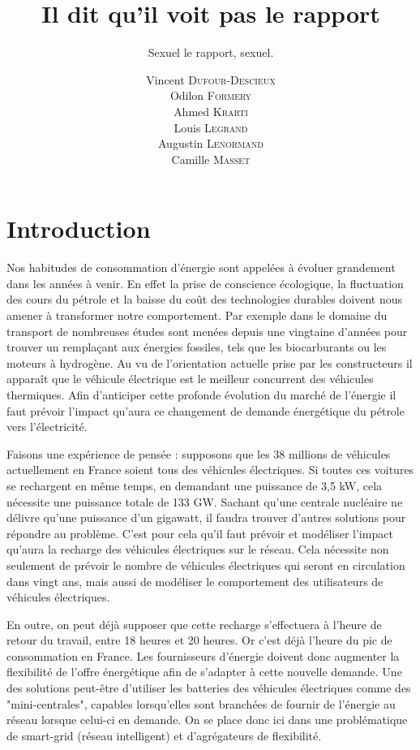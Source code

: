 \documentclass[10pt]{article}
\title{Il dit qu'il voit pas le rapport}
\subtitle{Sexuel le rapport, sexuel.}
\author{ Vincent \textsc{Dufour-Descieux} \\ Odilon \textsc{Formery} \\ Ahmed \textsc{Krarti} \\ Louis \textsc{Legrand} \\ Augustin \textsc{Lenormand} \\   Camille \textsc{Masset} }
\begin{document}
\maketitle
\section*{Introduction}

Nos habitudes de consommation d'énergie sont appelées à évoluer grandement dans les années à venir.
En effet la prise de conscience écologique, la fluctuation des cours du pétrole et la baisse du coût des technologies durables doivent nous amener à transformer notre comportement. 
Par exemple dans le domaine du transport de nombreuses études sont menées depuis une vingtaine d'années pour trouver un remplaçant aux énergies fossiles, tels que les biocarburants ou les moteurs à hydrogène.
Au vu de l'orientation actuelle prise par les constructeurs il apparaît que le véhicule électrique est le meilleur concurrent des véhicules thermiques. 
Afin d'anticiper cette profonde évolution du marché de l'énergie il faut prévoir l'impact qu'aura ce changement de demande énergétique du pétrole vers l'électricité. 

Faisons une expérience de pensée : supposons que les 38 millions de véhicules actuellement en France soient tous des véhicules électriques. Si toutes ces voitures se rechargent en même temps, en demandant une puissance de 3,5 kW, cela nécessite une puissance totale de 133 GW. Sachant qu'une centrale nucléaire ne délivre qu'une puissance d'un gigawatt, il faudra trouver d'autres solutions pour répondre au problème. C'est pour cela qu'il faut prévoir et modéliser l'impact qu'aura la recharge des véhicules électriques sur le réseau. Cela nécessite non seulement de prévoir le nombre de véhicules électriques qui seront en circulation dans vingt ans, mais aussi de modéliser le comportement des utilisateurs de véhicules électriques. 

En outre, on peut déjà supposer que cette recharge s'effectuera à l'heure de retour du travail, entre 18 heures et 20 heures. Or c'est déjà l'heure du pic de consommation en France. Les fournisseurs d'énergie doivent donc augmenter la flexibilité de l'offre énergétique afin de s'adapter à cette nouvelle demande. Une des solutions peut-être d'utiliser les batteries des véhicules électriques comme des "mini-centrales", capables lorsqu'elles sont branchées de fournir de l'énergie au réseau lorsque celui-ci en demande. On se place donc ici dans une problématique de smart-grid (réseau intelligent) et d'agrégateurs de flexibilité. 
\end{document}
